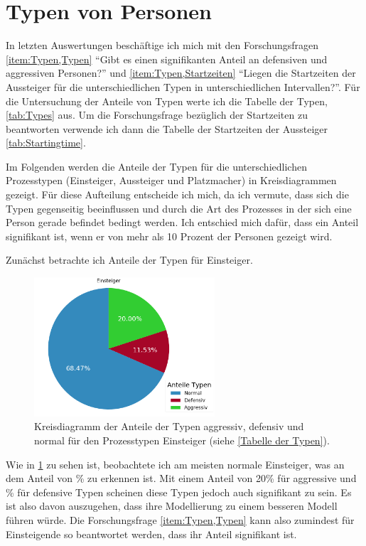 \section{Typen von Personen} \label{Typen}
In letzten Auswertungen beschäftige ich mich mit den Forschungsfragen \ref{item:Typen,Typen} "`Gibt es einen signifikanten Anteil an defensiven und aggressiven Personen?"' und \ref{item:Typen,Startzeiten} "`Liegen die Startzeiten der Aussteiger für die unterschiedlichen Typen in unterschiedlichen Intervallen?"'. Für die Untersuchung der Anteile von Typen werte ich die Tabelle der Typen, \tablename \ref{tab:Types} aus. Um die Forschungsfrage bezüglich der Startzeiten zu beantworten verwende ich dann die Tabelle der Startzeiten der Aussteiger \tablename \ref{tab:Startingtime}.

Im Folgenden werden die Anteile der Typen für die unterschiedlichen Prozesstypen (Einsteiger, Aussteiger und Platzmacher) in Kreisdiagrammen gezeigt. Für diese Aufteilung entscheide ich mich, da ich vermute, dass sich die Typen gegenseitig beeinflussen und durch die Art des Prozesses in der sich eine Person gerade befindet bedingt werden. Ich entschied mich dafür, dass ein Anteil signifikant ist, wenn er von mehr als 10 Prozent der Personen gezeigt wird.

Zunächst betrachte ich Anteile der Typen für Einsteiger. 
\begin{figure}[H]
	\centering
		\includegraphics[width=0.6\textwidth]{pictures/data_evaluation/types/proportions_Einsteiger.png}
	\caption{Kreisdiagramm der Anteile der Typen aggressiv, defensiv und normal für den Prozesstypen Einsteiger (siehe \ref{Tabelle der Typen}).}
	\label{fig:AnteileTypenEinsteiger}
\end{figure}
Wie in \figurename \ref{fig:AnteileTypenEinsteiger} zu sehen ist, beobachtete ich am meisten normale Einsteiger, was an dem Anteil von  \% zu erkennen ist. Mit einem Anteil von 20\% für aggressive und \% für defensive Typen scheinen diese Typen jedoch auch signifikant zu sein. Es ist also davon auszugehen, dass ihre Modellierung zu einem besseren Modell führen würde. Die Forschungsfrage \ref{item:Typen,Typen} kann also zumindest für Einsteigende so beantwortet werden, dass ihr Anteil signifikant ist. 

